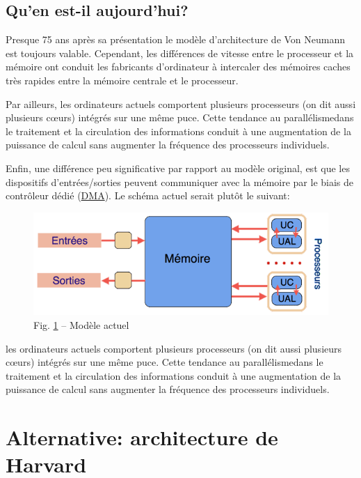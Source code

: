 \documentclass[11pt,french]{article}
\makeatletter
\def\maxwidth{\ifdim\Gin@nat@width>\linewidth\linewidth
    \else\Gin@nat@width\fi}
\let\Oldincludegraphics\includegraphics
\renewcommand{\includegraphics}[1]{\Oldincludegraphics[width=.8\maxwidth]{#1}}
\makeatother
\begin{document}
\hypertarget{perspectives}{%
\subsection{Qu'en est-il aujourd'hui?}\label{perspectives}}

Presque 75 ans après sa présentation le modèle d'architecture de Von
Neumann est toujours valable. 
Cependant, les différences de vitesse entre le processeur et la mémoire ont conduit les fabricants d'ordinateur à intercaler des mémoires caches très rapides entre la mémoire centrale et le processeur.

Par ailleurs, les ordinateurs actuels comportent plusieurs processeurs (on dit aussi
plusieurs \og c\oe urs\fg) intégrés sur une même puce. Cette tendance au
\og parallélisme\fg dans le traitement et la circulation des informations conduit à une augmentation de la puissance de calcul sans augmenter la fréquence des processeurs individuels.

Enfin, une différence peu significative par
rapport au modèle original, est que les dispositifs d'entrées/sorties peuvent communiquer avec la mémoire par le biais de contrôleur dédié
(\href{https://fr.wikipedia.org/wiki/Acc\%C3\%A8s_direct_\%C3\%A0_la_m\%C3\%A9moire}{DMA}).
Le schéma actuel serait plutôt le suivant:
\begin{figure}[h]
	\begin{center}
		\includegraphics{../img/modele-actuel.png}
	\end{center}
	\caption{Fig. \ref{fig:modelactuel} -- Modèle actuel}
	\label{fig:modelactuel}
\end{figure}

les ordinateurs actuels comportent plusieurs processeurs (on dit aussi
plusieurs \og c\oe urs\fg) intégrés sur une même puce. Cette tendance au
\og parallélisme\fg dans le traitement et la circulation des informations conduit à une augmentation de la puissance de calcul sans augmenter la
fréquence des processeurs individuels.

    \hypertarget{architecture-de-harvard}{%
\section{Alternative: architecture de Harvard}\label{architecture-de-harvard}}
\end{document}
